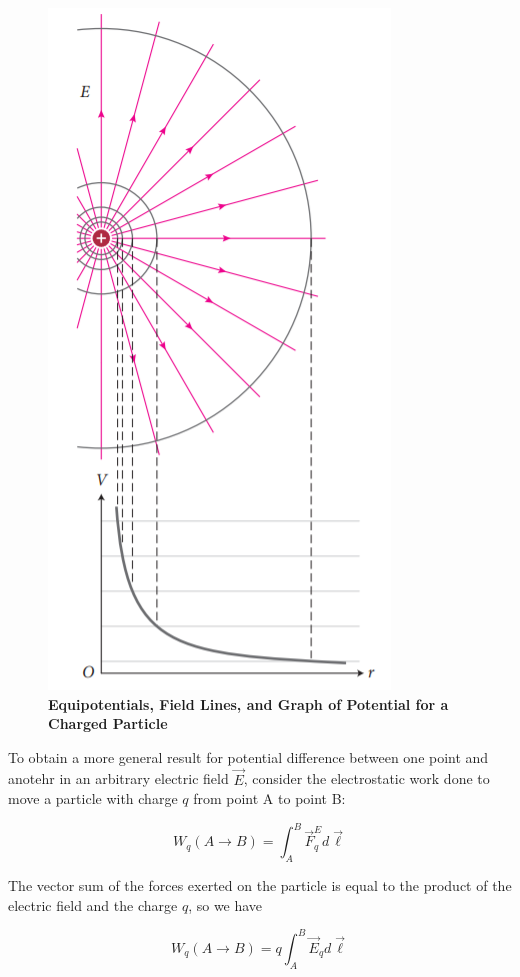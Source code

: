         \begin{figure}[hbt!]
            \centering
            \caption*{\textbf{Equipotentials, Field Lines, and Graph of Potential for a Charged Particle}}
            \includegraphics[scale = 0.75]{Resources/25.5_Electric_Diagram}
        \end{figure}

        To obtain a more general result for potential difference between one point and anotehr in an arbitrary electric field $\vec{E}$, consider the electrostatic work done to move a particle with charge $q$ from point
        A to point B:

        \[
            W_q (A\to B) = \int_A^B \vec{F}^E_q d\vec{\ell}
        \]

        The vector sum of the forces exerted on the particle is equal to the product of the electric field and the charge $q$, so we have

        \[
            W_q (A\to B) = q\int_A^B \vec{E}_q d\vec{\ell}
        \]

